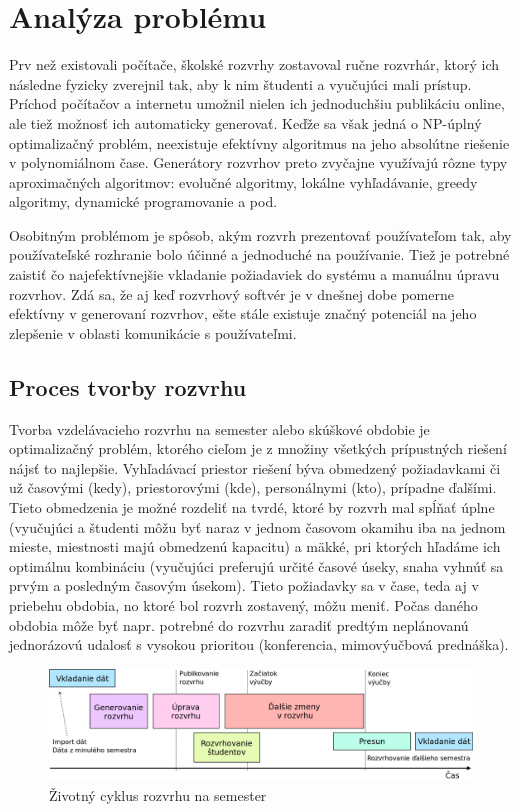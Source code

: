 \section{Analýza problému}
\label{sec:analysis}

Prv než existovali počítače, školské rozvrhy zostavoval ručne rozvrhár, ktorý
ich následne fyzicky zverejnil tak, aby k nim študenti a vyučujúci mali prístup.
Príchod počítačov a internetu umožnil nielen ich jednoduchšiu publikáciu online,
ale tiež možnosť ich automaticky generovať. Keďže sa však jedná o NP-úplný
optimalizačný problém, neexistuje efektívny algoritmus na jeho absolútne
riešenie v polynomiálnom čase. Generátory rozvrhov preto zvyčajne využívajú
rôzne typy aproximačných algoritmov: evolučné algoritmy, lokálne vyhľadávanie,
greedy algoritmy, dynamické programovanie a pod.

Osobitným problémom je spôsob, akým rozvrh prezentovať používateľom tak, aby
používateľské rozhranie bolo účinné a jednoduché na používanie. Tiež je potrebné
zaistiť čo najefektívnejšie vkladanie požiadaviek do systému a manuálnu úpravu
rozvrhov. Zdá sa, že aj keď rozvrhový softvér je v dnešnej dobe pomerne
efektívny v generovaní rozvrhov, ešte stále existuje značný potenciál na jeho
zlepšenie v oblasti komunikácie s používateľmi. 

\subsection{Proces tvorby rozvrhu}
\label{subsec:timetabling}

Tvorba vzdelávacieho rozvrhu na semester alebo skúškové obdobie je optimalizačný
problém, ktorého cieľom je z množiny všetkých prípustných riešení nájsť to
najlepšie. Vyhľadávací priestor riešení býva obmedzený požiadavkami či už
časovými (kedy), priestorovými (kde), personálnymi (kto), prípadne ďalšími.
Tieto obmedzenia je možné rozdeliť na tvrdé, ktoré by rozvrh mal spĺňať úplne
(vyučujúci a študenti môžu byť naraz v jednom časovom okamihu iba na jednom
mieste, miestnosti majú obmedzenú kapacitu) a mäkké, pri ktorých hľadáme ich
optimálnu kombináciu (vyučujúci preferujú určité časové úseky, snaha vyhnúť sa
prvým a posledným časovým úsekom). \cite{lukac} Tieto požiadavky sa v čase, teda
aj v priebehu obdobia, no ktoré bol rozvrh zostavený, môžu meniť. Počas daného
obdobia môže byť napr. potrebné do rozvrhu zaradiť predtým neplánovanú
jednorázovú udalosť s vysokou prioritou (konferencia, mimovýučbová prednáška).

\begin{figure}
  \centering
  \includegraphics[width=\textwidth]{figures/course-timetabling.png}
  \caption{\label{fig:course_timetabling} Životný cyklus rozvrhu na semester
    \cite{unitime_hl}}
\end{figure}

